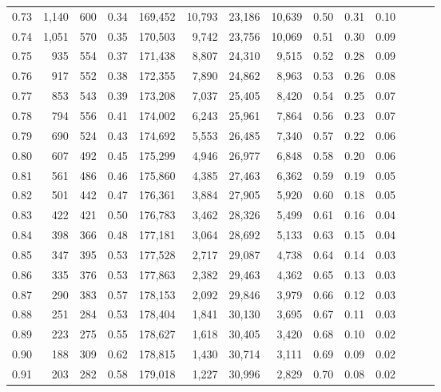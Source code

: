 \begin{tabular}{rrrrrrrrrrrrrr}
0.73 &  1,140 &    600 &  0.34 &  169,452 &   10,793 &  23,186 &  10,639 &  0.50 &  0.31 &      0.10 \\
0.74 &  1,051 &    570 &  0.35 &  170,503 &    9,742 &  23,756 &  10,069 &  0.51 &  0.30 &      0.09 \\
0.75 &    935 &    554 &  0.37 &  171,438 &    8,807 &  24,310 &   9,515 &  0.52 &  0.28 &      0.09 \\
0.76 &    917 &    552 &  0.38 &  172,355 &    7,890 &  24,862 &   8,963 &  0.53 &  0.26 &      0.08 \\
0.77 &    853 &    543 &  0.39 &  173,208 &    7,037 &  25,405 &   8,420 &  0.54 &  0.25 &      0.07 \\
0.78 &    794 &    556 &  0.41 &  174,002 &    6,243 &  25,961 &   7,864 &  0.56 &  0.23 &      0.07 \\
0.79 &    690 &    524 &  0.43 &  174,692 &    5,553 &  26,485 &   7,340 &  0.57 &  0.22 &      0.06 \\
0.80 &    607 &    492 &  0.45 &  175,299 &    4,946 &  26,977 &   6,848 &  0.58 &  0.20 &      0.06 \\
0.81 &    561 &    486 &  0.46 &  175,860 &    4,385 &  27,463 &   6,362 &  0.59 &  0.19 &      0.05 \\
0.82 &    501 &    442 &  0.47 &  176,361 &    3,884 &  27,905 &   5,920 &  0.60 &  0.18 &      0.05 \\
0.83 &    422 &    421 &  0.50 &  176,783 &    3,462 &  28,326 &   5,499 &  0.61 &  0.16 &      0.04 \\
0.84 &    398 &    366 &  0.48 &  177,181 &    3,064 &  28,692 &   5,133 &  0.63 &  0.15 &      0.04 \\
0.85 &    347 &    395 &  0.53 &  177,528 &    2,717 &  29,087 &   4,738 &  0.64 &  0.14 &      0.03 \\
0.86 &    335 &    376 &  0.53 &  177,863 &    2,382 &  29,463 &   4,362 &  0.65 &  0.13 &      0.03 \\
0.87 &    290 &    383 &  0.57 &  178,153 &    2,092 &  29,846 &   3,979 &  0.66 &  0.12 &      0.03 \\
0.88 &    251 &    284 &  0.53 &  178,404 &    1,841 &  30,130 &   3,695 &  0.67 &  0.11 &      0.03 \\
0.89 &    223 &    275 &  0.55 &  178,627 &    1,618 &  30,405 &   3,420 &  0.68 &  0.10 &      0.02 \\
0.90 &    188 &    309 &  0.62 &  178,815 &    1,430 &  30,714 &   3,111 &  0.69 &  0.09 &      0.02 \\
0.91 &    203 &    282 &  0.58 &  179,018 &    1,227 &  30,996 &   2,829 &  0.70 &  0.08 &      0.02 \\

\end{tabular}

